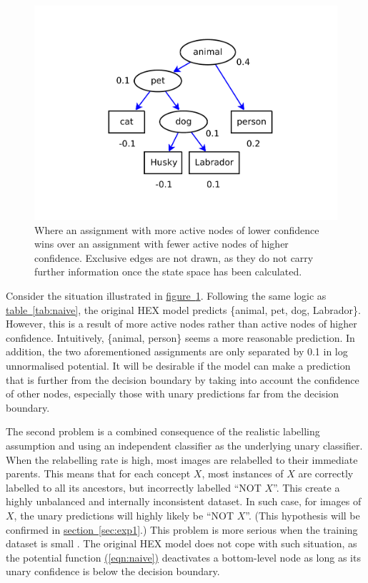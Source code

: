 \documentclass[11pt,a4paper]{article}
\begin{document}
\begin{figure}[htbp]
\centering\includegraphics[scale=0.5]{depth.pdf}
\caption{Where an assignment with more active nodes of lower confidence wins over an assignment with fewer active nodes of higher confidence. Exclusive edges are not drawn, as they do not carry further information once the state space has been calculated.}
\label{fig:depth}
\end{figure}

Consider the situation illustrated in \hyperref[fig:depth]{figure~\ref{fig:depth}}. Following the same logic as \hyperref[tab:naive]{table~\ref{tab:naive}}, the original HEX model predicts \{animal, pet, dog, Labrador\}. However, this is a result of more active nodes rather than active nodes of higher confidence. Intuitively, \{animal, person\} seems a more reasonable prediction. In addition, the two aforementioned assignments are only separated by 0.1 in log unnormalised potential. It will be desirable if the model can make a prediction that is further from the decision boundary by taking into account the confidence of other nodes, especially those with unary predictions far from the decision boundary.

The second problem is a combined consequence of the realistic labelling assumption and using an independent classifier as the underlying unary classifier. When the relabelling rate is high, most images are relabelled to their immediate parents. This means that for each concept $X$, most instances of $X$ are correctly labelled to all its ancestors, but incorrectly labelled ``NOT $X$''. This create a highly unbalanced and internally inconsistent dataset. In such case, for images of $X$, the unary predictions will highly likely be ``NOT $X$''. (This hypothesis will be confirmed in \hyperref[sec:exp1]{section~\ref{sec:exp1}}.) This problem is more serious when the training dataset is small \cite{he2009learning}. The original HEX model does not cope with such situation, as the potential function \hyperref[eqn:naive]{(\ref{eqn:naive})} deactivates a bottom-level node as long as its unary confidence is below the decision boundary.
\end{document}
